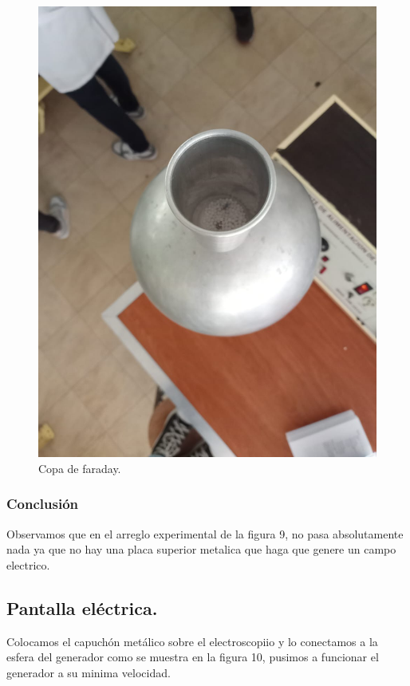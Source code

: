 \documentclass[10pt]{article}
\begin{document}
\begin{multicols}{2}
\begin{figure}[h]
\centering
\includegraphics[scale=0.07]{p12}
\caption{Copa de faraday.}
\end{figure}

\subsubsection*{Conclusión}
Observamos que en el arreglo experimental de la figura 9, no pasa absolutamente nada ya que no hay una placa superior metalica que haga que genere un campo electrico.
\subsection{Pantalla eléctrica.}
Colocamos el capuchón metálico sobre el electroscopiio y lo conectamos a la esfera del generador como se muestra en la figura 10, pusimos a funcionar el generador a su minima velocidad.


\end{multicols}
\end{document}
